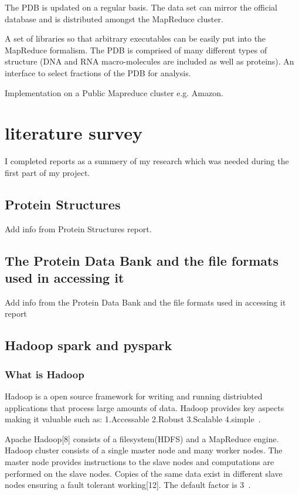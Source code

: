 \documentclass{report}
\begin{document}
The PDB is updated on a regular basis. The data set can mirror the official database and is distributed amongst the MapReduce cluster.

A set of libraries so that arbitrary executables can be easily put into the MapReduce formalism.
The PDB is comprised of many different types of structure (DNA and RNA macro-molecules are included as well as proteins). An interface to select fractions of the PDB for analysis.

Implementation on a Public Mapreduce cluster e.g. Amazon.

\section{literature survey}

I completed reports as a summery of my research which was needed during the first part of my project.

\subsection{Protein Structures}

Add info from Protein Structures report.

\subsection{The Protein Data Bank and the file formats used in accessing it}

Add info from the Protein Data Bank and the file formats used in accessing it report

\subsection{Hadoop spark and pyspark}

\subsubsection{What is Hadoop}

Hadoop is a open source framework for writing and running distriubted applications that process large amounts of data. Hadoop provides key aspects making it valuable such as: 1.Accessable 2.Robust 3.Scalable 4.simple~\cite{lam_hadoop_2010}.

Apache Hadoop[8] consists of a filesystem(HDFS) and a MapReduce engine. Hadoop cluster consists of a single master node and many worker nodes. The master node provides instructions to the slave nodes and computations are performed on the slave nodes. Copies of the same data exist in different slave nodes ensuring a fault tolerant working[12]. The default factor is 3~\cite{hazarika_performance_2017}.
\end{document}

